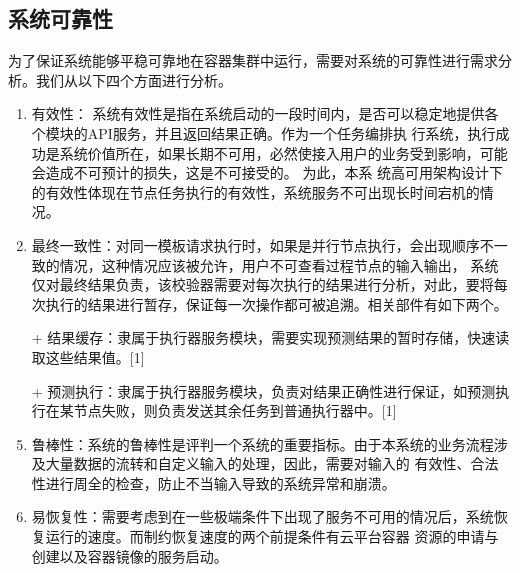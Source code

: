 %
%
%


\subsection{系统可靠性}
为了保证系统能够平稳可靠地在容器集群中运行，需要对系统的可靠性进行需求分析。我们从以下四个方面进行分析。
\begin{enumerate}
    \item 有效性： 系统有效性是指在系统启动的一段时间内，是否可以稳定地提供各个模块的API服务，并且返回结果正确。作为一个任务编排执
行系统，执行成功是系统价值所在，如果长期不可用，必然使接入用户的业务受到影响，可能会造成不可预计的损失，这是不可接受的。 为此，本系
统高可用架构设计下的有效性体现在节点任务执行的有效性，系统服务不可出现长时间宕机的情况。
    \item 最终一致性：对同一模板请求执行时，如果是并行节点执行，会出现顺序不一致的情况，这种情况应该被允许，用户不可查看过程节点的输入输出，
系统仅对最终结果负责，该校验器需要对每次执行的结果进行分析，对此，要将每次执行的结果进行暂存，保证每一次操作都可被追溯。相关部件有如下两个。
    \item[+] 结果缓存：隶属于执行器服务模块，需要实现预测结果的暂时存储，快速读取这些结果值。[1]
    \item[+] 预测执行：隶属于执行器服务模块，负责对结果正确性进行保证，如预测执行在某节点失败，则负责发送其余任务到普通执行器中。[1]
    \item 鲁棒性：系统的鲁棒性是评判一个系统的重要指标。由于本系统的业务流程涉及大量数据的流转和自定义输入的处理，因此，需要对输入的
有效性、合法性进行周全的检查，防止不当输入导致的系统异常和崩溃。
    \item 易恢复性：需要考虑到在一些极端条件下出现了服务不可用的情况后，系统恢复运行的速度。而制约恢复速度的两个前提条件有云平台容器
资源的申请与创建以及容器镜像的服务启动。
\end{enumerate}


